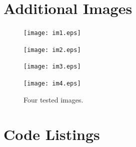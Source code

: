 \documentclass[12pt]{article}
\begin{document}
\section{Additional Images}
\begin{figure}[h]
	\centering %
	\captionsetup{justification=centering}
	\begin{minipage}{0.5\textwidth}
		\centering %
		\texttt{[image: im1.eps]}
		\label{im1} 
	\end{minipage}\hfill
	\begin{minipage}{0.5\textwidth}
		\centering %
		\texttt{[image: im2.eps]}
		 \label{pure_recon}
	\end{minipage}
\end{figure}
\begin{figure}[h]
	\centering %
	\captionsetup{justification=centering}
	\begin{minipage}{0.5\textwidth}
		\centering %
		\texttt{[image: im3.eps]}
		 \label{pixcoords} 
	\end{minipage}\hfill
	\begin{minipage}{0.5\textwidth}
		\centering %
		\texttt{[image: im4.eps]}
		\label{pure_recon}
	\end{minipage}
	\caption{Four tested images.}
\end{figure}

\newpage
\section{Code Listings}\label{code}


 




%
%
%
\end{document}
